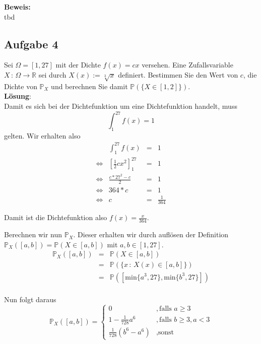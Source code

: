 \documentclass[11pt,a4paper,ngerman]{article}
\begin{document}
\textbf{Beweis:}\\

tbd


\subsection*{Aufgabe 4}

Sei $\Omega = [1,27]$ mit der Dichte $f(x) = cx$ versehen. Eine Zufallsvariable $X \, : \, \Omega \rightarrow \mathbb{R}$ sei durch $X(x) := \sqrt[3]{x}$ definiert.
Bestimmen Sie den Wert von $c$, die Dichte von $\mathbb{P}_X$ und berechnen Sie damit $\mathbb{P}(\{X \in [1,2]\})$.\\

\textbf{Lösung}:\\

Damit es sich bei der Dichtefunktion um eine Dichtefunktion handelt, muss
\[
    \int_1^{27} f(x) = 1
\]
gelten.
Wir erhalten also
$$\begin{array}{crcl}
                & \int_1^{27} f(x) &=& 1\\
\Leftrightarrow & \left[ \frac{1}{2} cx^2\right]_1^{27} & = & 1\\
\Leftrightarrow & \frac{c*27^2 - c}{2} & = & 1\\
\Leftrightarrow & 364 * c &=& 1\\
\Leftrightarrow & c &=& \frac{1}{364}
\end{array}$$

Damit ist die Dichtefunktion also $f(x) = \frac{x}{364}$.

Berechnen wir nun $\mathbb{P}_X$. Dieser erhalten wir durch auflösen der Definition $\mathbb{P}_X([a,b]) = \mathbb{P}(X \in [a,b])$ mit $a,b \in [1,27]$.
$$\begin{array}{rlc}
    \mathbb{P}_X([a,b]) &=& \mathbb{P}(X \in [a,b])\\
                        &=& \mathbb{P}(\{x \, : \, X(x) \in [a,b]\})\\
                        &=& \mathbb{P}([\text{min}\{a^3,27\},\text{min}\{b^3,27\}])\\
\end{array}$$

    Nun folgt daraus
\[
    \mathbb{P}_X([a,b]) = \left\{ 
    \begin{array}{lr}
        0 &,\text{falls }a\geq3\\
        1 - \frac{1}{728} a^6 &,\text{falls }b\geq 3, a<3\\
        \frac{1}{728}\left( b^6 - a^6\right)&, \text{sonst}
    \end{array}
    \right.
\]
\end{document}
